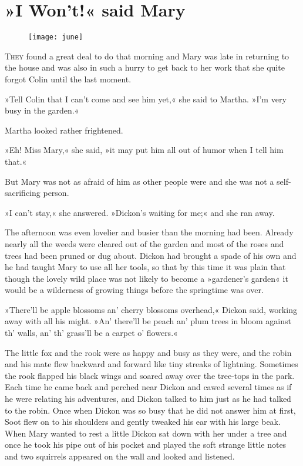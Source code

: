 \chapter{»I Won't!« said Mary} 
	
\begin{figure}[t!]
\centering
\texttt{[image: june]}
\end{figure}

	\lettrine[lines=6]{T}{hey} found a great deal to do that morning and Mary was late in returning to the house and was also in such a hurry to get back to her work that she quite forgot Colin until the last moment.

\zz
»Tell Colin that I can't come and see him yet,« she said to Martha. »I'm very busy in the garden.«

Martha looked rather frightened.

»Eh! Miss Mary,« she said, »it may put him all out of humor when I tell him that.«

But Mary was not as afraid of him as other people were and she was not a self-sacrificing person.

»I can't stay,« she answered. »Dickon's waiting for me;« and she ran away.

The afternoon was even lovelier and busier than the morning had been. Already nearly all the weeds were cleared out of the garden and most of the roses and trees had been pruned or dug about. Dickon had brought a spade of his own and he had taught Mary to use all her tools, so that by this time it was plain that though the lovely wild place was not likely to become a »gardener's garden« it would be a wilderness of growing things before the springtime was over.

»There'll be apple blossoms an' cherry blossoms overhead,« Dickon said, working away with all his might. »An' there'll be peach an' plum trees in bloom against th' walls, an' th' grass'll be a carpet o' flowers.«

The little fox and the rook were as happy and busy as they were, and the robin and his mate flew backward and forward like tiny streaks of lightning. Sometimes the rook flapped his black wings and soared away over the tree-tops in the park. Each time he came back and perched near Dickon and cawed several times as if he were relating his adventures, and Dickon talked to him just as he had talked to the robin. Once when Dickon was so busy that he did not answer him at first, Soot flew on to his shoulders and gently tweaked his ear with his large beak. When Mary wanted to rest a little Dickon sat down with her under a tree and once he took his pipe out of his pocket and played the soft strange little notes and two squirrels appeared on the wall and looked and listened.

